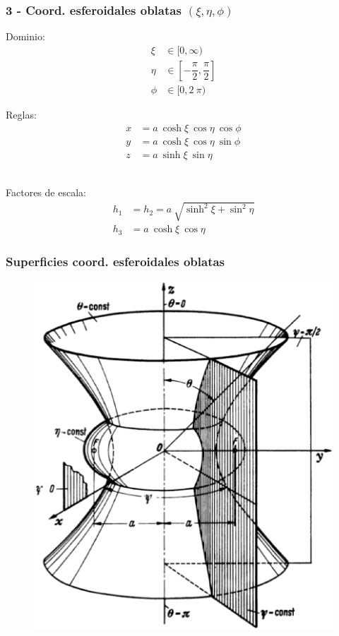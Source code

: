 \documentclass[12pt]{beamer}
\begin{document}
\begin{frame}
\frametitle{3 - Coord. esferoidales oblatas $(\xi, \eta, \phi)$}
\fontsize{12}{12}\selectfont
\setlength{\abovedisplayskip}{-1pt}
\begin{minipage}{0.45\textwidth}
Dominio:
\begin{align*}
\xi &\in [0, \infty) \\
\eta &\in \left[- \dfrac{\pi}{2}, \dfrac{\pi}{2} \right] \\
\phi &\in [0, 2\: \pi)
\end{align*}
\end{minipage}
\hspace{1cm}
\pause
\begin{minipage}{0.4\textwidth}
Reglas:
\begin{align*}
x &= a \: \cosh \xi \: \cos \eta \: \cos \phi \\
y &= a \: \cosh \xi \: \cos \eta \: \sin \phi\\
z &= a \: \sinh \xi \: \sin \eta
\end{align*}
\end{minipage}%
\\[1em]
\pause
Factores de escala:
\begin{align*}
h_{1 }&= h_{2} = a \: \sqrt{\sinh^{2} \xi + \sin^{2} \eta} \\
h_{3 }&= a \: \cosh \xi \: \cos \eta
\end{align*}
\end{frame}
\begin{frame}
\frametitle{Superficies coord. esferoidales oblatas}
\begin{figure}[H]
  \centering
  \includegraphics[scale=0.3]{Imagenes/Sistema_Esfeoridal_Oblato.eps}
\end{figure}
\end{frame}  
\end{document}
